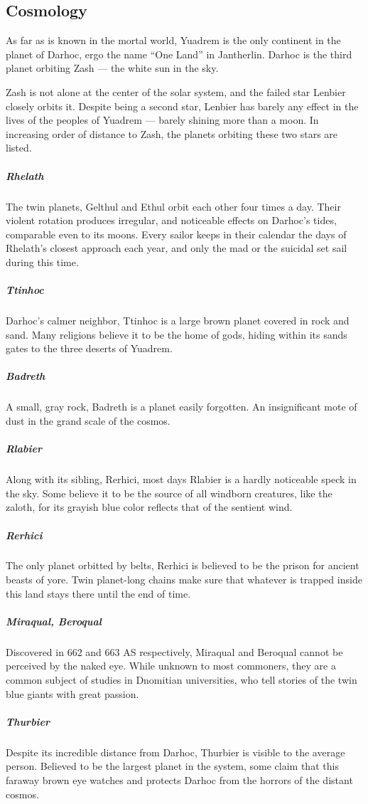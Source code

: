 \subsection*{Cosmology}
As far as is known in the mortal world, Yuadrem is the only continent in the planet of Darhoc, ergo the name ``One Land'' in Jantherlin.
Darhoc is the third planet orbiting Zash --- the white sun in the sky.

Zash is not alone at the center of the solar system, and the failed star Lenbier closely orbits it.
Despite being a second star, Lenbier has barely any effect in the lives of the peoples of Yuadrem --- barely shining more than a moon.
In increasing order of distance to Zash, the planets orbiting these two stars are listed.

\subparagraph{Rhelath} The twin planets, Gelthul and Ethul orbit each other four times a day.
Their violent rotation produces irregular, and noticeable effects on Darhoc's tides, comparable even to its moons.
Every sailor keeps in their calendar the days of Rhelath's closest approach each year, and only the mad or the suicidal set sail during this time.

\subparagraph{Ttinhoc} Darhoc's calmer neighbor, Ttinhoc is a large brown planet covered in rock and sand.
Many religions believe it to be the home of gods, hiding within its sands gates to the three deserts of Yuadrem.

\subparagraph{Badreth} A small, gray rock, Badreth is a planet easily forgotten.
An insignificant mote of dust in the grand scale of the cosmos.

\subparagraph{Rlabier} Along with its sibling, Rerhici, most days Rlabier is a hardly noticeable speck in the sky.
Some believe it to be the source of all windborn creatures, like the zaloth, for its grayish blue color reflects that of the sentient wind.

\subparagraph{Rerhici} The only planet orbitted by belts, Rerhici is believed to be the prison for ancient beasts of yore.
Twin planet-long chains make sure that whatever is trapped inside this land stays there until the end of time.

\subparagraph{Miraqual, Beroqual} Discovered in 662 and 663 AS respectively, Miraqual and Beroqual cannot be perceived by the naked eye.
While unknown to most commoners, they are a common subject of studies in Dnomitian universities, who tell stories of the twin blue giants with great passion.

\subparagraph{Thurbier} Despite its incredible distance from Darhoc, Thurbier is visible to the average person.
Believed to be the largest planet in the system, some claim that this faraway brown eye watches and protects Darhoc from the horrors of the distant cosmos.
